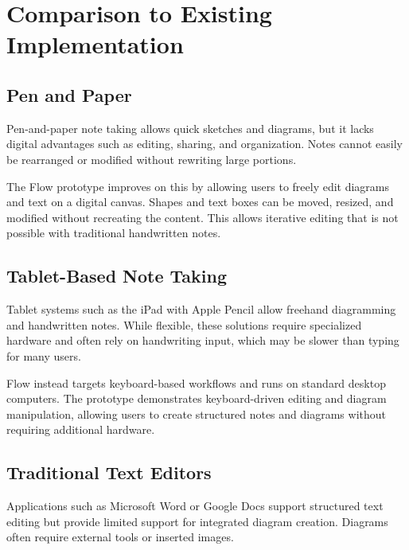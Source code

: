 \documentclass[12pt, titlepage]{article}
\begin{document}
\section{Comparison to Existing Implementation}
\setlength{\parindent}{0pt}

\subsection{Pen and Paper}

Pen-and-paper note taking allows quick sketches and diagrams, but it lacks digital
advantages such as editing, sharing, and organization. Notes cannot easily be
rearranged or modified without rewriting large portions.

\vspace{1em}

The Flow prototype improves on this by allowing users to freely edit diagrams and
text on a digital canvas. Shapes and text boxes can be moved, resized, and modified
without recreating the content. This allows iterative editing that is not possible
with traditional handwritten notes.

\subsection{Tablet-Based Note Taking}

Tablet systems such as the iPad with Apple Pencil allow freehand diagramming and
handwritten notes. While flexible, these solutions require specialized hardware and
often rely on handwriting input, which may be slower than typing for many users.

\vspace{1em}

Flow instead targets keyboard-based workflows and runs on standard desktop computers.
The prototype demonstrates keyboard-driven editing and diagram manipulation, allowing
users to create structured notes and diagrams without requiring additional hardware.

\subsection{Traditional Text Editors}

Applications such as Microsoft Word or Google Docs support structured text editing
but provide limited support for integrated diagram creation. Diagrams often require
external tools or inserted images.
\end{document}
